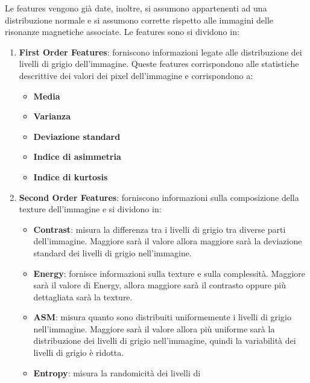 Le features vengono già date, inoltre, si assumono appartenenti ad una distribuzione 
normale e si assumono corrette rispetto alle immagini delle risonanze magnetiche
associate\cite{explanation-features}. Le features sono si dividono in:
\begin{enumerate}
      \item \textbf{First Order Features}: forniscono informazioni legate alle
            distribuzione dei livelli di grigio dell'immagine. Queste features
            corrispondono alle statistiche descrittive dei valori dei pixel 
            dell'immagine e corrispondono a:
            \begin{itemize}
                  \item \textbf{Media}
                  \item \textbf{Varianza}
                  \item \textbf{Deviazione standard}
                  \item \textbf{Indice di asimmetria}
                  \item \textbf{Indice di kurtosis}
            \end{itemize}
      \item \textbf{Second Order Features}: forniscono informazioni sulla composizione
            della texture dell'immagine e si dividono in:
            \begin{itemize}
                  \item \textbf{Contrast}: misura la differenza tra i livelli di
                        grigio tra diverse parti dell'immagine. Maggiore sarà il
                        valore allora maggiore sarà la deviazione standard dei
                        livelli di grigio nell'immagine.
                  \item \textbf{Energy}: fornisce informazioni sulla texture e
                        sulla complessità. Maggiore sarà il valore di Energy,
                        allora maggiore sarà il contrasto oppure più dettagliata
                        sarà la texture.
                  \item \textbf{ASM}: misura quanto sono distribuiti uniformemente
                        i livelli di grigio nell'immagine. Maggiore sarà il valore
                        allora più uniforme sarà la distribuzione dei livelli di
                        grigio nell'immagine, quindi la variabilità dei livelli
                        di grigio è ridotta.
                  \item \textbf{Entropy}: misura la randomicità dei livelli di

\end{itemize}
\end{enumerate}
